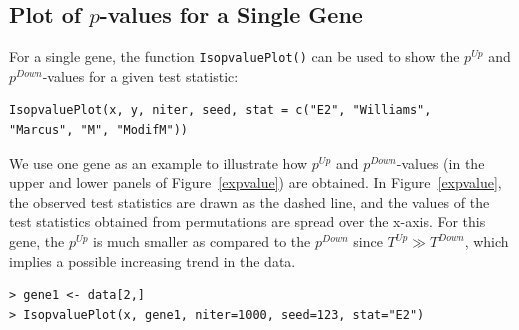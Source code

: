 \subsection{Plot of $p$-values for a Single Gene}

For a single gene, the function \texttt{IsopvaluePlot()} can be used
to show the $p^{Up}$ and $p^{Down}$-values for a given test
statistic:
\begin{center}
\begin{boxit}
\begin{verbatim}
IsopvaluePlot(x, y, niter, seed, stat = c("E2", "Williams",
"Marcus", "M", "ModifM"))
\end{verbatim}
\end{boxit}
\end{center}
We use one gene as an example to illustrate how $p^{Up}$ and
$p^{Down}$-values (in the upper and lower panels of
Figure~\ref{expvalue}) are obtained. In Figure~\ref{expvalue}, the
observed test statistics are drawn as the dashed line, and the
values of the test statistics obtained from permutations are spread
over the x-axis. For this gene, the $p^{Up}$ is much smaller as
compared to the $p^{Down}$ since $T^{Up} \gg T^{Down}$, which
implies a possible increasing trend in the data.
\begin{center}
\begin{boxit}
\begin{verbatim}
> gene1 <- data[2,]
> IsopvaluePlot(x, gene1, niter=1000, seed=123, stat="E2")
\end{verbatim}
\end{boxit}
\end{center}


